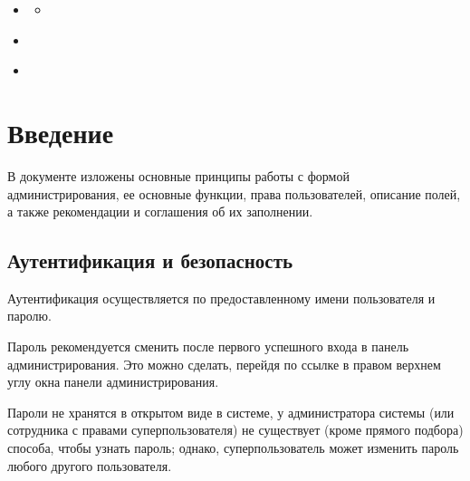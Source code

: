 \documentclass[letterpaper,10pt,russian]{sphinxmanual}
\begin{document}
\begin{sphinxShadowBox}
\begin{itemize}
\begin{itemize}
\end{itemize}

\item {} 
\label{\detokenize{main:id129}}{\hyperref[\detokenize{main:id58}]{}}
\begin{itemize}
\item {} 
\label{\detokenize{main:id130}}{\hyperref[\detokenize{main:id59}]{}}

\end{itemize}

\item {} 
\label{\detokenize{main:id131}}{\hyperref[\detokenize{main:id61}]{}}

\item {} 
\label{\detokenize{main:id132}}{\hyperref[\detokenize{main:id62}]{}}

\end{itemize}
\end{sphinxShadowBox}


\section{Введение}
\label{\detokenize{main:id3}}
В документе изложены основные принципы работы с формой администрирования, ее основные функции,
права пользователей, описание полей, а также рекомендации и соглашения об их заполнении.

\ignorespaces 

\subsection{Аутентификация и безопасность}
\label{\detokenize{main:id4}}\label{\detokenize{main:index-0}}
Аутентификация осуществляется по предоставленному имени пользователя и паролю.

Пароль рекомендуется сменить после первого успешного входа в панель администрирования.
Это можно сделать, перейдя по ссылке в правом верхнем углу окна панели администрирования.

Пароли не хранятся в открытом виде в системе, у администратора системы (или сотрудника с
правами суперпользователя) не существует (кроме прямого подбора) способа, чтобы узнать пароль;
однако, суперпользователь может изменить пароль любого другого пользователя.
\end{document}
